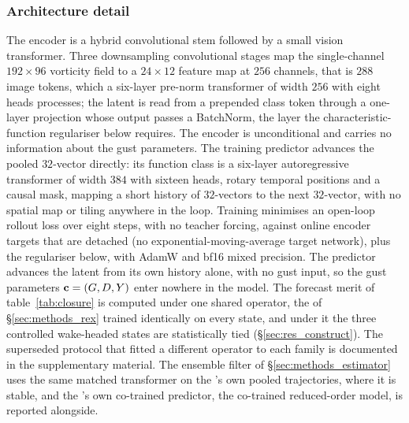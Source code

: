 
\subsubsection*{Architecture detail}
The encoder is a hybrid convolutional stem
followed by a small vision transformer. Three downsampling convolutional stages
map the single-channel $192 \times 96$ vorticity field to a $24 \times 12$ feature
map at $256$ channels, that is $288$ image tokens, which a six-layer
pre-norm transformer of width $256$ with eight heads processes; the latent is read
from a prepended class token through a one-layer projection whose output passes a
BatchNorm, the layer the characteristic-function regulariser below requires. The
encoder is unconditional and carries no information about the gust parameters. The
training predictor advances the pooled $32$-vector directly: its function class is a
six-layer autoregressive transformer of width $384$ with sixteen heads, rotary
temporal positions and a causal mask, mapping a short history of $32$-vectors to
the next $32$-vector, with no spatial map or tiling anywhere in the loop. Training
minimises an open-loop rollout loss over eight steps, with no teacher forcing,
against online encoder targets that are detached (no exponential-moving-average
target network), plus the regulariser below, with AdamW and bf16 mixed
precision. The predictor advances the latent from its own history alone, with no
gust input, so the gust parameters $\mathbf{c} = (G, D, Y)$ enter nowhere in the
model. The forecast merit of table~\ref{tab:closure} is computed under one shared
operator, the \DirectFC{} of \S\ref{sec:methods_rex} trained identically on every
state, and under it the three controlled wake-headed states are statistically tied
(\S\ref{sec:res_construct}). The superseded protocol that fitted a different
operator to each family is documented in the supplementary material. The ensemble
filter of
\S\ref{sec:methods_estimator} uses the same matched transformer on the \PredState's
own pooled trajectories, where it is stable, and the \PredState's own co-trained
predictor, the co-trained reduced-order model, is reported alongside.\re

